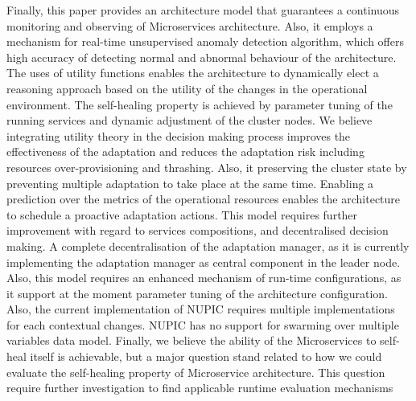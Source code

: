 \documentclass[sigconf]{acmart}
\begin{document}
Finally, this paper provides an architecture model that guarantees a continuous monitoring and observing of Microservices architecture. Also, it employs a mechanism for real-time unsupervised anomaly detection algorithm, which offers high accuracy of detecting normal and abnormal behaviour of the architecture. The uses of utility functions enables the architecture to dynamically elect a reasoning approach based on the utility of the changes in the operational environment.
The self-healing property is achieved by parameter tuning of the running services and dynamic adjustment of the cluster nodes. We believe integrating utility theory in the decision making process improves the effectiveness of the adaptation and reduces the adaptation risk including resources over-provisioning and thrashing. Also, it preserving the cluster state by preventing multiple adaptation to take place at the same time. Enabling a prediction over the metrics of the operational resources enables the architecture to schedule a proactive adaptation actions. 
This model requires further improvement with regard to services compositions, and decentralised decision making. A complete decentralisation of the adaptation manager, as it is currently implementing the adaptation manager as central component in the leader node. Also, this model requires an enhanced mechanism of run-time configurations, as it support at the moment parameter tuning of the architecture configuration. Also, the current implementation of NUPIC requires multiple implementations for each contextual changes. NUPIC has no support for swarming over multiple variables data model. Finally, we believe the ability of the Microservices to self-heal itself is achievable, but a major question stand related to how we could evaluate the self-healing property of Microservice architecture. This question require further investigation to find applicable runtime evaluation mechanisms      


 
\end{document}
